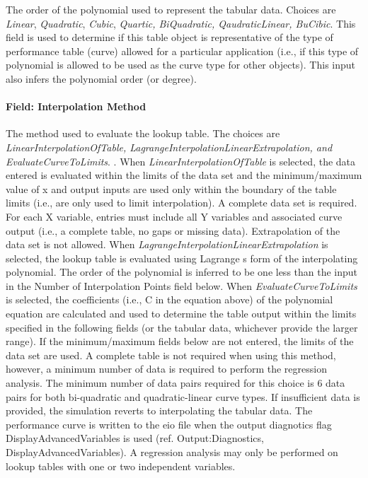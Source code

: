 The order of the polynomial used to represent the tabular data. Choices are \emph{Linear}, \emph{Quadratic}, \emph{Cubic}, \emph{Quartic, BiQuadratic, QaudraticLinear, BuCibic}. This field is used to determine if this table object is representative of the type of performance table (curve) allowed for a particular application (i.e., if this type of polynomial is allowed to be used as the curve type for other objects). This input also infers the polynomial order (or degree).

\paragraph{Field: Interpolation Method}\label{field-interpolation-method-2}

The method used to evaluate the lookup table. The choices are \emph{LinearInterpolationOfTable, LagrangeInterpolationLinearExtrapolation, and EvaluateCurveToLimits}. . When \emph{LinearInterpolationOfTable} is selected, the data entered is evaluated within the limits of the data set and the minimum/maximum value of x and output inputs are used only within the boundary of the table limits (i.e., are only used to limit interpolation). A complete data set is required. For each X variable, entries must include all Y variables and associated curve output (i.e., a complete table, no gaps or missing data). Extrapolation of the data set is not allowed. When \emph{LagrangeInterpolationLinearExtrapolation} is selected, the lookup table is evaluated using Lagrange s form of the interpolating polynomial. The order of the polynomial is inferred to be one less than the input in the Number of Interpolation Points field below. When \emph{EvaluateCurveToLimits} is selected, the coefficients (i.e., C in the equation above) of the polynomial equation are calculated and used to determine the table output within the limits specified in the following fields (or the tabular data, whichever provide the larger range). If the minimum/maximum fields below are not entered, the limits of the data set are used. A complete table is not required when using this method, however, a minimum number of data is required to perform the regression analysis. The minimum number of data pairs required for this choice is 6 data pairs for both bi-quadratic and quadratic-linear curve types. If insufficient data is provided, the simulation reverts to interpolating the tabular data. The performance curve is written to the eio file when the output diagnotics flag DisplayAdvancedVariables is used (ref. Output:Diagnostics, DisplayAdvancedVariables). A regression analysis may only be performed on lookup tables with one or two independent variables.

